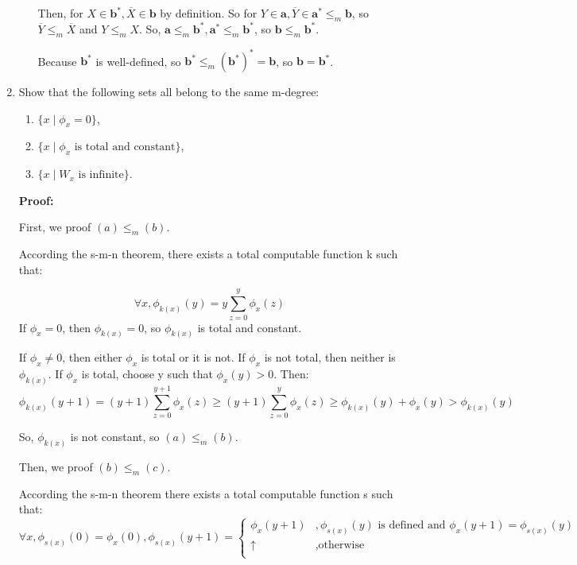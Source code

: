 \documentclass[12pt,a4paper]{article}
\theoremstyle{definition}
\numberwithin{equation}{section}
\numberwithin{figure}{section}
\begin{document}
\begin{enumerate}
\begin{enumerate}
    Then, for $X \in \mathbf{b}^*, \overline{X} \in \mathbf{b}$ by definition. So for $Y \in \mathbf{a}, \overline{Y} \in \mathbf{a}^* \leq_m \mathbf{b}$, so $\overline{Y} \leq_m \overline{X}$ and $Y \leq_m X$. So, $\mathbf{a} \leq_m \mathbf{b}^*, \mathbf{a}^* \leq_m \mathbf{b}^*$, so $\mathbf{b} \leq_m \mathbf{b}^*$.
    
    Because $\mathbf{b}^*$ is well-defined, so $\mathbf{b}^* \leq_m (\mathbf{b}^*)^* = \mathbf{b}$, so $\mathbf{b} = \mathbf{b}^*$.   

  \end{enumerate}

\item Show that the following sets all belong to the same m-degree:
\begin{enumerate}
\item $\{x \mid \phi_x=0\}$,
\item $\{x \mid \phi_x \mbox{ is total and constant}\}$,
\item $\{x \mid W_x \mbox{ is infinite}\}$.
\end{enumerate}

\textbf{Proof:}

First, we proof $(a) \leq_m (b)$.

According the s-m-n theorem, there exists a total computable function k such
that:

$$\forall x, \phi_{k(x)}(y) = y \sum_{z=0}^{y}\phi_x(z)$$
If $\phi_x = 0$, then $\phi_{k(x)} = 0$, so $\phi_{k(x)}$ is total and constant.

If $\phi_x \neq 0$, then either $\phi_x$ is total or it is not. If $\phi_x$ is not total, then neither is $\phi_{k(x)}$. If $\phi_x$ is total, choose y such that $\phi_x(y) >0$. Then:
$$\phi_{k(x)}(y+1) = (y+1)\sum_{z=0}^{y+1}\phi_x(z) \geq (y+1)\sum_{z=0}^{y}\phi_x(z) \geq \phi_{k(x)}(y) + \phi_x(y) > \phi_{k(x)}(y)$$

So, $\phi_{k(x)}$ is not constant, so $(a) \leq_m (b)$.

Then, we proof $(b) \leq_m (c)$.

According the s-m-n theorem there exists a total computable function s such that:
$$ \forall x, \phi_{s(x)}(0) = \phi_x(0), \phi_{s(x)}(y+1) = \begin{cases} \phi_x(y+1) &, \phi_{s(x)}(y) \mbox{ is defined and } \phi_x(y+1) = \phi_{s(x)}(y) \\ \uparrow &, \mbox{otherwise} \\ \end{cases} $$


\end{enumerate}
\end{document}
